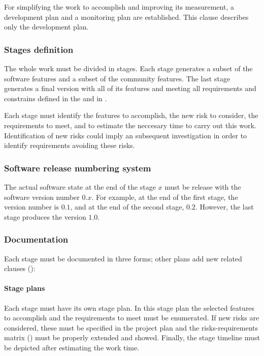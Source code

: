 \documentclass[twocolumn, 9pt]{extarticle}
\begin{document}
For simplifying the work to accomplish and improving its measurement,
a development plan and a monitoring plan are established. This clause
describes only the development plan.

\subsubsection{Stages definition}
\label{sssec:stages-definition}
The whole work must be divided in stages. Each stage generates a
subset of the \fav software features and a subset of the \fav
community features. The last stage generates a final version with all
of its features and meeting all requirements and constrains defined
in the \favc and in .

Each stage must identify the features to accomplish, the new risk to
consider, the requirements to meet, and to estimate the neccesary
time to carry out this work. Identification of new risks could imply
an subsequent investigation in order to identify requirements avoiding
these risks.

\subsubsection{Software release numbering system}
\label{sssec:release}
The actual software state at the end of the stage $x$ must be release
with the software version number $0.x$. For example, at the end of the first
stage, the version number is $0.1$, and at the end of the second
stage, $0.2$. However, the last stage produces the \fav version
$1.0$.

\subsubsection{Documentation}
Each stage must be documented in three forms; other plans add new
related clauses
():

\paragraph{Stage plans}
\label{par:stage-plans}
Each stage must have its own stage plan. In this stage plan the
selected features to accomplish and the requirements to meet must
be enumerated. If new risks are considered, these must be specified in
the project plan and the risks-requirements matrix
() must be properly extended and
showed. Finally, the stage timeline must be depicted after estimating
the work time.
\end{document}
